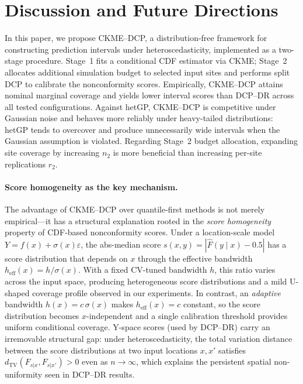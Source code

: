 
\section{Discussion and Future Directions}
\label{sec:discussion}

In this paper, we propose CKME--DCP, a distribution-free framework for
constructing prediction intervals under heteroscedasticity, implemented
as a two-stage procedure.
Stage~1 fits a conditional CDF estimator via CKME; Stage~2 allocates
additional simulation budget to selected input sites and performs split
DCP to calibrate the nonconformity scores.
Empirically, CKME--DCP attains nominal marginal coverage and yields
lower interval scores than DCP--DR across all tested configurations.
Against hetGP, CKME--DCP is competitive under Gaussian noise and
behaves more reliably under heavy-tailed distributions: hetGP tends to
overcover and produce unnecessarily wide intervals when the Gaussian
assumption is violated.
Regarding Stage~2 budget allocation, expanding site coverage by
increasing $n_2$ is more beneficial than increasing per-site
replications $r_2$.

\paragraph{Score homogeneity as the key mechanism.}
The advantage of CKME--DCP over quantile-first methods is not merely
empirical---it has a structural explanation rooted in the \emph{score
homogeneity} property of CDF-based nonconformity scores.
Under a location-scale model $Y = f(x) + \sigma(x)\varepsilon$, the
abs-median score $s(x,y) = |\hat{F}(y \mid x) - 0.5|$ has a score
distribution that depends on $x$ through the effective bandwidth
$h_{\mathrm{eff}}(x) = h/\sigma(x)$.
With a fixed CV-tuned bandwidth $h$, this ratio varies across the
input space, producing heterogeneous score distributions and a mild
U-shaped coverage profile observed in our experiments.
In contrast, an \emph{adaptive} bandwidth $h(x) = c\,\sigma(x)$
makes $h_{\mathrm{eff}}(x) = c$ constant, so the score distribution
becomes $x$-independent and a single calibration threshold provides
uniform conditional coverage.
Y-space scores (used by DCP--DR) carry an irremovable structural gap:
under heteroscedasticity, the total variation distance between the
score distributions at two input locations $x, x'$ satisfies
$d_{\mathrm{TV}}(F_{s|x}, F_{s|x'}) > 0$ even as $n \to \infty$,
which explains the persistent spatial non-uniformity seen in DCP--DR results.

